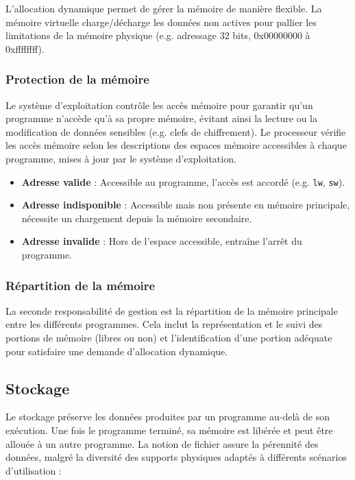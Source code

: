 L'allocation dynamique permet de gérer la mémoire de manière flexible. La mémoire virtuelle charge/décharge les données non actives pour pallier les limitations de la mémoire physique (e.g. adressage 32 bits, 0x00000000 à 0xffffffff).


\subsubsection{Protection de la mémoire}

Le système d'exploitation contrôle les accès mémoire pour garantir qu'un programme n'accède qu'à sa propre mémoire, évitant ainsi la lecture ou la modification de données sensibles (e.g. clefs de chiffrement). 
Le processeur vérifie les accès mémoire selon les descriptions des espaces mémoire accessibles à chaque programme, mises à jour par le système d'exploitation.

\begin{itemize}
    \item \textbf{Adresse valide} : Accessible au programme, l'accès est accordé (e.g. \texttt{lw}, \texttt{sw}).
    \item \textbf{Adresse indisponible} : Accessible mais non présente en mémoire principale, nécessite un chargement depuis la mémoire secondaire.
    \item \textbf{Adresse invalide} : Hors de l'espace accessible, entraîne l'arrêt du programme.
\end{itemize}



\subsubsection{Répartition de la mémoire}

La seconde responsabilité de gestion est la répartition de la mémoire principale entre les différents programmes. 
Cela inclut la représentation et le suivi des portions de mémoire (libres ou non) et l'identification d'une portion adéquate pour satisfaire une demande d'allocation dynamique.

\subsection{Stockage}

Le stockage préserve les données produites par un programme au-delà de son exécution. Une fois le programme terminé, sa mémoire est libérée et peut être allouée à un autre programme. 
La notion de fichier assure la pérennité des données, malgré la diversité des supports physiques adaptés à différents scénarios d’utilisation :

